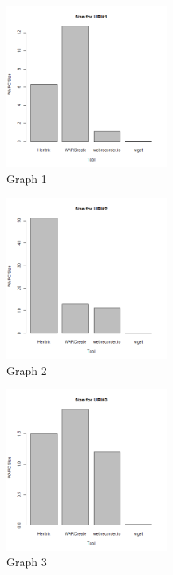 \documentclass{article}
\begin{document}
\begin{center}
\begin{figure}[ht]
    \centering
    \includegraphics[width=0.475\textwidth,natwidth=700,natheight=700]{graph1.png}
    \caption{Graph 1}
    \label{fig:graph1}
\end{figure}
\begin{figure}[ht]
    \centering
    \includegraphics[width=0.475\textwidth,natwidth=700,natheight=700]{graph2.png}
    \caption{Graph 2}
    \label{fig:graph2}
\end{figure}
\begin{figure}[ht]
    \centering
    \includegraphics[width=0.475\textwidth,natwidth=700,natheight=700]{graph3.png}
    \caption{Graph 3}
    \label{fig:graph3}
\end{figure}
\end{center}
\end{document}
